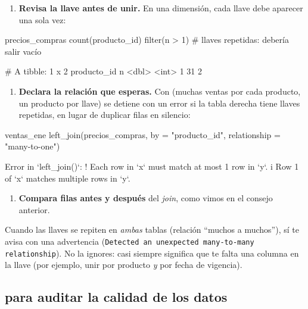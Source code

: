 \begin{enumerate}
  \item \textbf{Revisa la llave antes de unir.} En una dimensión, cada llave
        debe aparecer una sola vez:
\end{enumerate}

\begin{rcode}
precios_compras %
  count(producto_id) %
  filter(n > 1)             # llaves repetidas: debería salir vacío
\end{rcode}
\begin{rsalida}
# A tibble: 1 x 2
  producto_id     n
        <dbl> <int>
1          31     2
\end{rsalida}

\begin{enumerate}[resume]
  \item \textbf{Declara la relación que esperas.} Con
         (muchas ventas por cada
        producto, un producto por llave)  se detiene con un
        error si la tabla derecha tiene llaves repetidas, en lugar de
        duplicar filas en silencio:
\end{enumerate}

\begin{rnoejecutar}
ventas_ene %
  left_join(precios_compras, by = "producto_id",
            relationship = "many-to-one")
\end{rnoejecutar}
\begin{rsalida}
Error in `left_join()`:
! Each row in `x` must match at most 1 row in `y`.
i Row 1 of `x` matches multiple rows in `y`.
\end{rsalida}

\begin{enumerate}[resume]
  \item \textbf{Compara filas antes y después} del \emph{join}, como vimos
        en el consejo anterior.
\end{enumerate}

Cuando las llaves se repiten en \emph{ambas} tablas (relación
``muchos a muchos''),  sí te avisa con una advertencia
(\texttt{Detected an unexpected many-to-many relationship}). No la ignores:
casi siempre significa que te falta una columna en la llave (por ejemplo,
unir por producto \emph{y} por fecha de vigencia).

\subsection{\texorpdfstring{}{anti\_join()} para auditar la calidad de los datos}

